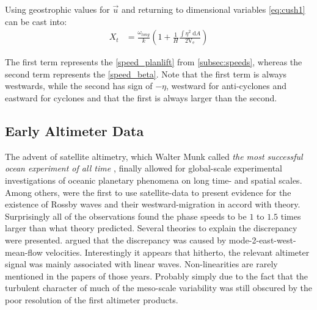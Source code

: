 Using geostrophic values for $\vec{u}$ and returning to dimensional variables \eqref{eq:cush1} can be cast into:
\begin{equation}\begin{split}
	X_t
	&=
	\frac{\omega_{long}}{k} \left(1 +\frac{1}{H} \frac{ \int  \eta^2 \; \mathrm{d}A	}{2\mathrm{V_e}} \right)
\end{split}\end{equation}

The first term represents the \ref{speed_planlift} from \ref{subsec:speeds}, whereas the second term represents the \ref{speed_beta}. Note that the first term is always westwards, while the second has sign of $-\eta$, \ie westward for anti-cyclones and eastward for cyclones and that the first is always larger than the second.



\subsection{Early Altimeter Data}\label{sec:hist_killworth}
The advent of satellite altimetry, which Walter Munk called \textit{the most successful ocean experiment of all time \citep{Munk2002}}, finally allowed for
global-scale experimental investigations of oceanic planetary phenomena on long time- and spatial scales. Among others,
\cite{matano1993seasonal,cipollini1997concurrent,le1993sea} were the first to use satellite-data to present evidence for the existence of Rossby waves and their
westward-migration in accord with theory. Surprisingly all of the observations found the phase speeds to be $1$ to $1.5$ times larger than what theory
predicted. Several theories to explain the discrepancy were presented. \Eg \cite{Killworth1997a} argued that the discrepancy was caused by
mode-2-east-west-mean-flow velocities. Interestingly it appears that hitherto, the relevant altimeter signal was mainly associated with linear waves.
Non-linearities are rarely mentioned in the papers of those years. Probably simply due to the fact that the turbulent character of much of the
meso-scale variability was still obscured by the poor resolution of the first altimeter products.



